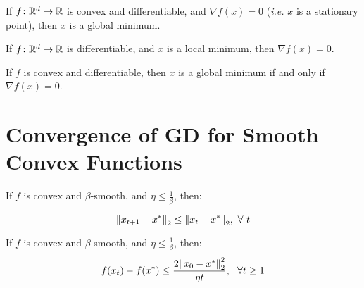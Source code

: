 \begin{lemma}
    If \(f \colon \mathbb{R}^d \to \mathbb{R}\) is convex and differentiable, and \(\nabla f(x) = 0\) 
    (\emph{i.e.} \(x\) is a stationary point), then \(x\) is a global minimum. 
\end{lemma}

\begin{lemma}
    If \(f \colon \mathbb{R}^d \to \mathbb{R}\) is differentiable, and \(x\) is a local minimum, then 
    \(\nabla f(x) = 0\). 
\end{lemma} 

\begin{corollary}
    If \(f\) is convex and differentiable, then \(x\) is a global minimum if and only 
    if \(\nabla f(x) = 0\). 
\end{corollary}


\section{Convergence of GD for Smooth Convex Functions}



\begin{lemma} 
    If \(f\) is convex and \(\beta\)-smooth, and \(\eta \leq \frac{1}{\beta}\), then: 

    \[
        \norm{x_{t+1} - x^*}_2 \leq \norm{x_t - x^*}_2, \ \forall \ t   
    \]
\end{lemma}


\begin{theorem}
    If \(f\) is convex and \(\beta\)-smooth, and \(\eta \leq \frac{1}{\beta}\), then: 
    \[
        f(x_t) - f(x^*) \leq \frac{2 \norm{x_0 - x^*}_2^2}{\eta t}, \ \ \forall t \geq 1   
    \]    
\end{theorem}



